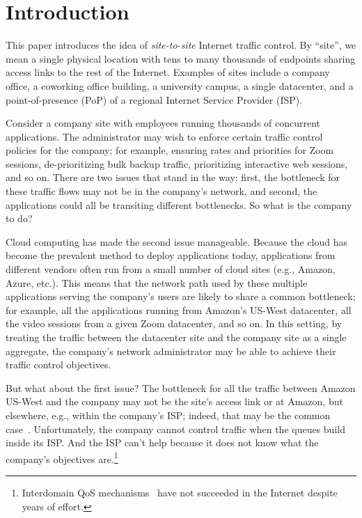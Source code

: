 \section{Introduction}\label{s:intro}

This paper introduces the idea of {\em site-to-site} Internet traffic control. By ``site'', we mean a single physical location with tens to many thousands of endpoints sharing access links to the rest of the Internet. Examples of sites include a company office, a coworking office building, a university campus, a single datacenter, and a point-of-presence (PoP) of a regional Internet Service Provider (ISP). 


Consider a company site with employees running thousands of concurrent applications. The administrator may wish to enforce certain traffic control policies for the company; for example, ensuring rates and priorities for Zoom sessions, de-prioritizing bulk backup traffic, prioritizing interactive web sessions, and so on. There are two issues that stand in the way: first, the bottleneck for these traffic flows may not be in the company's network, and second, the applications could all be transiting different bottlenecks. So what is the company to do?

Cloud computing has made the second issue manageable. Because the cloud has become the prevalent method to deploy applications today, applications from different vendors often run from a small number of cloud sites (e.g., Amazon, Azure, etc.). This means that the network path used by these multiple applications serving the company's users are likely to share a common bottleneck; for example, all the applications running from Amazon's US-West datacenter, all the video sessions from a given Zoom datacenter, and so on. In this setting,  by treating the traffic between the datacenter site and the company site as a single aggregate, the company's network administrator may be able to achieve their traffic control objectives.


But what about the first issue? The bottleneck for all the traffic between Amazon US-West and the company may not be the site's access link or at Amazon, but elsewhere, e.g., within the company's ISP; indeed, that may be the common case~\cite{inferring-interdomain-congestion, isp-throttle-1, isp-throttle-2, isp-throttle-3}. Unfortunately, the company cannot control traffic when the queues build inside its ISP. And the ISP can't help because it does not know what the company's objectives are.\footnote{Interdomain QoS mechanisms~\cite{braden1997resource, wroclawski1997use} have not succeeded in the Internet despite years of effort.}

